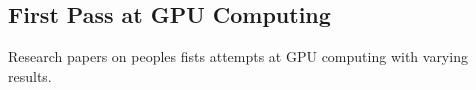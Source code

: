 \subsection{First Pass at GPU Computing}

Research papers on peoples fists attempts at GPU computing with varying results.